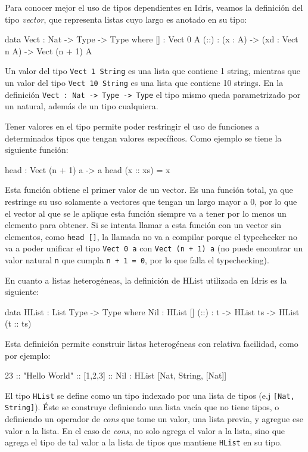 Para conocer mejor el uso de tipos dependientes en Idris, veamos la definición del tipo \textit{vector}, que representa listas cuyo largo es anotado en su tipo:

\begin{code}
data Vect : Nat -> Type -> Type where
  [] : Vect 0 A
  (::) : (x : A) -> (xd : Vect n A) -> Vect (n + 1) A
\end{code}

Un valor del tipo \texttt{Vect 1 String} es una lista que contiene 1 string, mientras que un valor del tipo \texttt{Vect 10 String} es una lista que contiene 10 strings. En la definición \texttt{Vect : Nat -> Type -> Type} el tipo mismo queda parametrizado por un natural, además de un tipo cualquiera.

Tener valores en el tipo permite poder restringir el uso de funciones a determinados tipos que tengan valores específicos. Como ejemplo se tiene la siguiente función:

\begin{code}
head : Vect (n + 1) a -> a
head (x :: xs) = x
\end{code}

Esta función obtiene el primer valor de un vector. Es una función total, ya que restringe su uso solamente a vectores que tengan un largo mayor a 0, por lo que el vector al que se le aplique esta función siempre va a tener por lo menos un elemento para obtener. Si se intenta llamar a esta función con un vector sin elementos, como \texttt{head []}, la llamada no va a compilar porque el typechecker no va a poder unificar el tipo \texttt{Vect 0 a} con \texttt{Vect (n + 1) a} (no puede encontrar un valor natural \texttt{n} que cumpla \texttt{n + 1 = 0}, por lo que falla el typechecking).

En cuanto a listas heterogéneas, la definición de HList utilizada en Idris es la siguiente:

\begin{code}
data HList : List Type -> Type where
  Nil : HList []
  (::) : t -> HList ts -> HList (t :: ts)
\end{code}

Esta definición permite construir listas heterogéneas con relativa facilidad, como por ejemplo:

\begin{code}
23 :: "Hello World" :: [1,2,3] :: Nil :
  HList [Nat, String, [Nat]]
\end{code}

El tipo \texttt{HList} se define como un tipo indexado por una lista de tipos (e.j \texttt{[Nat, String]}). Éste se construye definiendo una lista vacía que no tiene tipos, o definiendo un operador de \textit{cons} que tome un valor, una lista previa, y agregue ese valor a la lista. En el caso de \textit{cons}, no solo agrega el valor a la lista, sino que agrega el tipo de tal valor a la lista de tipos que mantiene \texttt{HList} en su tipo.

